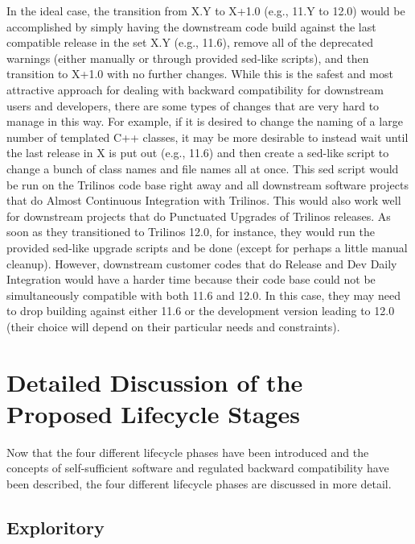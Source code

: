 \documentclass[11pt]{SANDreport}
\begin{document}
In the ideal case, the transition from X.Y to X+1.0 (e.g., 11.Y to
12.0) would be accomplished by simply having the downstream code build
against the last compatible release in the set X.Y (e.g., 11.6),
remove all of the deprecated warnings (either manually or through
provided sed-like scripts), and then transition to X+1.0 with no
further changes.  While this is the safest and most attractive approach
for dealing with backward compatibility for downstream users and
developers, there are some types of changes that are very hard to
manage in this way.  For example, if it is desired to change the
naming of a large number of templated C++ classes, it may be more
desirable to instead wait until the last release in X is put out
(e.g., 11.6) and then create a sed-like script to change a bunch of
class names and file names all at once.  This sed script would be run
on the Trilinos code base right away and all downstream software
projects that do Almost Continuous Integration
{}\cite{SoftwareIntegrationforCSE09} with Trilinos.  This would also
work well for downstream projects that do Punctuated Upgrades
{}\cite{SoftwareIntegrationforCSE09} of Trilinos releases.  As soon as
they transitioned to Trilinos 12.0, for instance, they would run the
provided sed-like upgrade scripts and be done (except for perhaps a
little manual cleanup).  However, downstream customer codes that do
Release and Dev Daily Integration {}\cite{SoftwareIntegrationforCSE09}
would have a harder time because their code base could not be
simultaneously compatible with both 11.6 and 12.0.  In this case, they
may need to drop building against either 11.6 or the development
version leading to 12.0 (their choice will depend on their particular
needs and constraints).


%
{}\section{Detailed Discussion of the Proposed Lifecycle Stages}
\label{sec:detained_lifecycle_stages}
%

Now that the four different lifecycle phases have been introduced and
the concepts of self-sufficient software and regulated backward
compatibility have been described, the four different lifecycle phases
are discussed in more detail.


%
{}\subsection{Exploritory}
\label{sec:exploratory_code}
%
\end{document}
